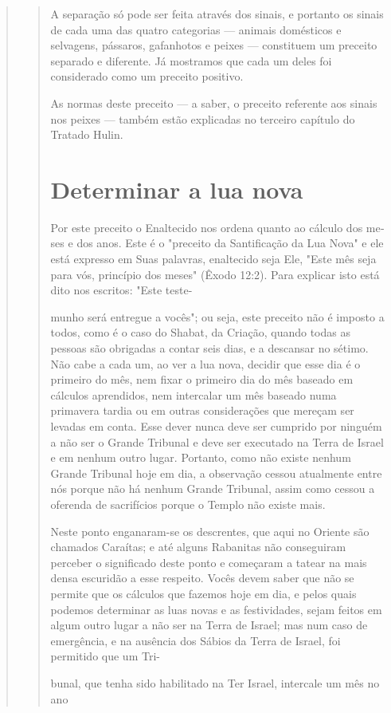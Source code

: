 \begin{quote}
\begin{quote}
A separação só pode ser feita através dos sinais, e portanto os sinais
de cada uma das quatro categorias --- animais domésticos e selvagens,
pássaros, gafanhotos e peixes --- constituem um preceito separado e
diferente. Já mostra­mos que cada um deles foi considerado como um
preceito positivo.

As normas deste preceito --- a saber, o preceito referente aos sinais
nos peixes --- também estão explicadas no terceiro capítulo do Tratado
Hulin.

\section{Determinar a lua nova}

Por este preceito o Enaltecido nos ordena quanto ao cálculo dos me­ses e
dos anos. Este é o "preceito da Santificação da Lua Nova" e ele está
ex­presso em Suas palavras, enaltecido seja Ele, "Este mês seja para
vós, princípio dos meses" (Êxodo 12:2). Para explicar isto está dito nos
escritos: "Este teste-



munho será entregue a vocês"; ou seja, este preceito não é imposto a
todos, como é o caso do Shabat, da Criação, quando todas as pessoas são
obrigadas a contar seis dias, e a descansar no sétimo. Não cabe a cada
um, ao ver a lua nova, decidir que esse dia é o primeiro do mês, nem
fixar o primeiro dia do mês baseado em cálculos aprendidos, nem
intercalar um mês baseado numa primavera tardia ou em outras
considerações que mereçam ser levadas em con­ta. Esse dever nunca deve
ser cumprido por ninguém a não ser o Grande Tri­bunal e deve ser
executado na Terra de Israel e em nenhum outro lugar. Por­tanto, como
não existe nenhum Grande Tribunal hoje em dia, a observação cessou
atualmente entre nós porque não há nenhum Grande Tribunal, assim como
cessou a oferenda de sacrifícios porque o Templo não existe mais.

Neste ponto enganaram-se os descrentes, que aqui no Oriente são chamados
Caraítas; e até alguns Rabanitas não conseguiram perceber o signifi­cado
deste ponto e começaram a tatear na mais densa escuridão a esse
respeito. Vocês devem saber que não se permite que os cálculos que
fazemos hoje em dia, e pelos quais podemos determinar as luas novas e as
festividades, sejam feitos em algum outro lugar a não ser na Terra de
Israel; mas num caso de emer­gência, e na ausência dos Sábios da Terra
de Israel, foi permitido que um Tri-

bunal, que tenha sido habilitado na Ter Israel, intercale um mês no ano


\end{quote}
\end{quote}
